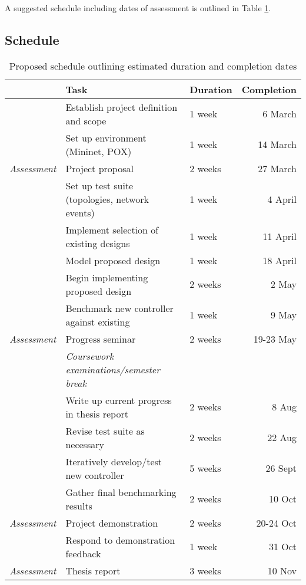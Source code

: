 \documentclass[pdftex,12pt,a4paper]{article}
\begin{document}
A suggested schedule including dates of assessment is outlined in Table \ref{table:schedule}.

\subsection{Schedule}

\begin{table}[H]
	\begin{center}
		\begin{tabular}{@{}rllr@{}}
			\toprule
			& Task & Duration & Completion\\
			\midrule
			& Establish project definition and scope & 1 week & 6 March \\
			& Set up environment (Mininet,  POX) & 1 week & 14 March \\
			\emph{Assessment} & Project proposal & 2 weeks & 27 March \\
			& Set up test suite (topologies, network events) & 1 week & 4 April \\
			& Implement selection of existing designs & 1 week & 11 April \\
			& Model proposed design & 1 week & 18 April \\
			& Begin implementing proposed design & 2 weeks & 2 May \\
			& Benchmark new controller against existing & 1 week & 9 May \\
			\emph{Assessment} & Progress seminar & 2 weeks & 19-23 May \\
			\addlinespace
			& \emph{Coursework examinations/semester break} \\
			\addlinespace
			& Write up current progress in thesis report & 2 weeks & 8 Aug\\
			& Revise test suite as necessary & 2 weeks & 22 Aug\\
			& Iteratively develop/test new controller & 5 weeks & 26 Sept\\
			& Gather final benchmarking results & 2 weeks & 10 Oct \\
			\emph{Assessment} & Project demonstration & 2 weeks & 20-24 Oct \\
			& Respond to demonstration feedback & 1 week & 31 Oct \\
			\emph{Assessment} & Thesis report & 3 weeks & 10 Nov \\
			\bottomrule
		\end{tabular}
		\caption{Proposed schedule outlining estimated duration and completion dates}
		\label{table:schedule}
	\end{center}
\end{table}
\end{document}
